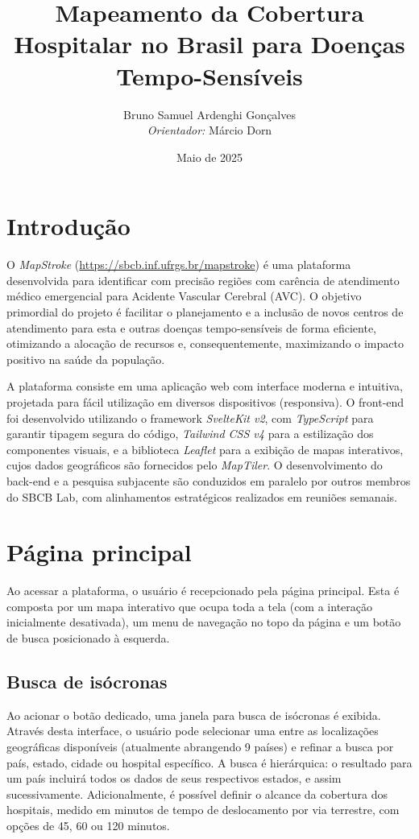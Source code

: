 \documentclass{article}
\title{Mapeamento da Cobertura Hospitalar no Brasil para Doenças Tempo-Sensíveis}
\author{
    Bruno Samuel Ardenghi Gonçalves \\
    \textit{Orientador:} Márcio Dorn
}
\date{\normalsize Maio de 2025}
\begin{document}
\maketitle

\section{Introdução}

O \textit{MapStroke} (\url{https://sbcb.inf.ufrgs.br/mapstroke}) é uma plataforma desenvolvida para identificar com precisão regiões com carência de atendimento médico emergencial para Acidente Vascular Cerebral (AVC). O objetivo primordial do projeto é facilitar o planejamento e a inclusão de novos centros de atendimento para esta e outras doenças tempo-sensíveis de forma eficiente, otimizando a alocação de recursos e, consequentemente, maximizando o impacto positivo na saúde da população.

A plataforma consiste em uma aplicação web com interface moderna e intuitiva, projetada para fácil utilização em diversos dispositivos (responsiva). O front-end foi desenvolvido utilizando o framework \textit{SvelteKit v2}, com \textit{TypeScript} para garantir tipagem segura do código, \textit{Tailwind CSS v4} para a estilização dos componentes visuais, e a biblioteca \textit{Leaflet} para a exibição de mapas interativos, cujos dados geográficos são fornecidos pelo \textit{MapTiler}. O desenvolvimento do back-end e a pesquisa subjacente são conduzidos em paralelo por outros membros do SBCB Lab, com alinhamentos estratégicos realizados em reuniões semanais.

\section{Página principal}

Ao acessar a plataforma, o usuário é recepcionado pela página principal. Esta é composta por um mapa interativo que ocupa toda a tela (com a interação inicialmente desativada), um menu de navegação no topo da página e um botão de busca posicionado à esquerda.

\subsection{Busca de isócronas}

Ao acionar o botão dedicado, uma janela para busca de isócronas é exibida. Através desta interface, o usuário pode selecionar uma entre as localizações geográficas disponíveis (atualmente abrangendo 9 países) e refinar a busca por país, estado, cidade ou hospital específico. A busca é hierárquica: o resultado para um país incluirá todos os dados de seus respectivos estados, e assim sucessivamente. Adicionalmente, é possível definir o alcance da cobertura dos hospitais, medido em minutos de tempo de deslocamento por via terrestre, com opções de 45, 60 ou 120 minutos.
\end{document}
